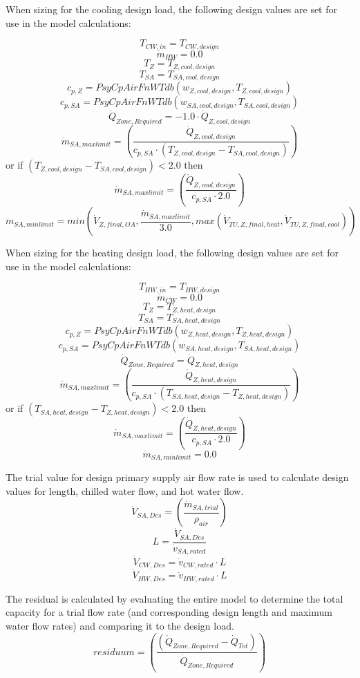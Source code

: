 When sizing for the cooling design load, the following design values are set for use in the model calculations:

\[{T_{CW,in}} = {T_{CW,design}}\] \[{\dot m_{HW}} = 0.0\] \[{T_{Z}} = {T_{Z,cool,design } }\] \[{T_{SA}} = {T_{SA,cool,design } }\] \[{c_{p,Z}} = {PsyCpAirFnWTdb ({w_{Z,cool,design } },  {T_{Z,cool,design } }  ) }\] \[{c_{p,SA}} = {PsyCpAirFnWTdb ( {w_{SA,cool,design } },  {T_{SA,cool,design } }   ) }\] \[{\dot Q_{Zone, Required}} = -1.0 \cdot {\dot Q_{Z,cool,design } }\] \[{\dot m_{SA,max limit}} = { \left(\frac{{\dot Q_{Z,cool,design } }}{{c_{p,SA}} \cdot {( {T_{Z,cool,design } } - {T_{SA,cool,design } } )}}  \right) }\] or if \(( {T_{Z,cool,design }} - {T_{SA,cool,design } } ) < 2.0\) then \[{\dot m_{SA,max limit}} = { \left(\frac{{\dot Q_{Z,cool,design } }}{{c_{p,SA}} \cdot 2.0 } \right) }\] \[{\dot m_{SA,min limit}} = min( {\dot V_{Z,final,OA} }, \frac{{\dot m_{SA,max limit}}}{3.0}, max({\dot V_{TU,Z,final,heat} } , {\dot V_{TU,Z,final,cool} }) )\]

When sizing for the heating design load, the following design values are set for use in the model calculations:

\[{T_{HW,in}} = {T_{HW,design}}\] \[{\dot m_{CW}} = {0.0}\] \[{T_{Z}} = {T_{Z,heat,design } }\] \[{T_{SA}} = {T_{SA,heat,design } }\] \[{c_{p,Z}} = {PsyCpAirFnWTdb ({w_{Z,heat,design } },  {T_{Z,heat,design } }  ) }\] \[{c_{p,SA}} = {PsyCpAirFnWTdb ( {w_{SA,heat,design } },  {T_{SA,heat,design } }   ) }\] \[{\dot Q_{Zone, Required}} = {\dot Q_{Z,heat,design } }\] \[{\dot m_{SA,max limit}} = { \left(\frac{{\dot Q_{Z,heat,design } }}{{c_{p,SA}} \cdot ( {T_{SA,heat,design } } - {T_{Z,heat,design }} ) } \right) }\] or if \(( {T_{SA,heat,design } } - {T_{Z,heat,design } }) < 2.0\) then \[{\dot m_{SA,max limit}} = { \left(\frac{{\dot Q_{Z,heat,design } }}{{c_{p,SA}} \cdot 2.0 } \right) }\] \[{\dot m_{SA,min limit}} = {0.0}\]

The trial value for design primary supply air flow rate is used to calculate design values for length, chilled water flow, and hot water flow. \[{\dot V_{SA,Des}} = { \left(\frac{ {\dot m_{SA,trial}} }{{\rho_{air}} } \right) }\] \[{L} = {\frac{{\dot V_{SA,Des}}}{{\dot v_{SA,rated}}}  }\] \[{\dot V_{CW,Des}} = {{\dot v_{CW,rated}} \cdot {L} }\] \[{\dot V_{HW,Des}} = {{\dot v_{HW,rated}} \cdot {L} }\]

The residual is calculated by evaluating the entire model to determine the total capacity for a trial flow rate (and corresponding design length and maximum water flow rates) and comparing it to the design load. \[{residuum} = \left(\frac{ ({\dot Q_{Zone, Required}} - {\dot Q_{Tot}} )}{{\dot Q_{Zone, Required}}}\right)\]

